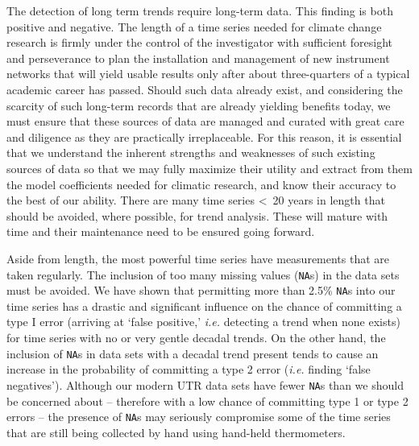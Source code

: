 \documentclass[]{ametsoc}
\begin{document}
The detection of long term trends require long-term data. This finding is both positive and negative. The length of a time series needed for climate change research is firmly under the control of the investigator with sufficient foresight and perseverance to plan the installation and management of new instrument networks that will yield usable results only after about three-quarters of a typical academic career has passed. Should such data already exist, and considering the scarcity of such long-term records that are already yielding benefits today, we must ensure that these sources of data are managed and curated with great care and diligence as they are practically irreplaceable. For this reason, it is essential that we understand the inherent strengths and weaknesses of such existing sources of data so that we may fully maximize their utility and extract from them the model coefficients needed for climatic research, and know their accuracy to the best of our ability. There are many time series \textless~20 years in length that should be avoided, where possible, for trend analysis. These will mature with time and their maintenance need to be ensured going forward.

Aside from length, the most powerful time series have measurements that are taken regularly. The inclusion of too many missing values (\texttt{NA}s) in the data sets must be avoided. We have shown that permitting more than 2.5\% \texttt{NA}s into our time series has a drastic and significant influence on the chance of committing a type I error (arriving at `false positive,' \emph{i.e.} detecting a trend when none exists) for time series with no or very gentle decadal trends. On the other hand, the inclusion of \texttt{NA}s in data sets with a decadal trend present tends to cause an increase in the probability of committing a type 2 error (\emph{i.e.} finding `false negatives'). Although our modern UTR data sets have fewer \texttt{NA}s than we should be concerned about -- therefore with a low chance of committing type 1 or type 2 errors -- the presence of \texttt{NA}s may seriously compromise some of the time series that are still being collected by hand using hand-held thermometers.
\end{document}
